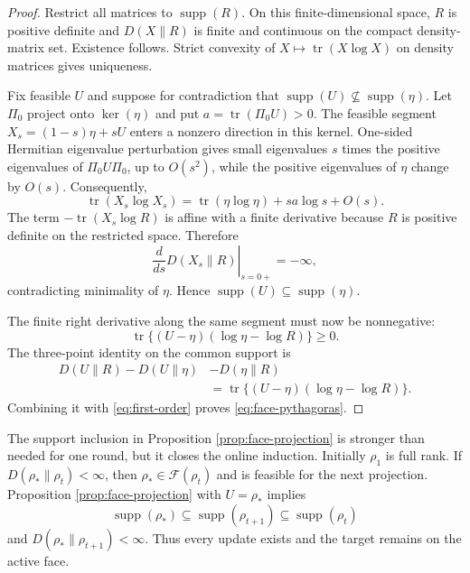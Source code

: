\documentclass[twoside]{article}
\newcommand{\tr}{\operatorname{tr}}
\newcommand{\supp}{\operatorname{supp}}
\begin{document}
\begin{proof}
Restrict all matrices to $\supp(R)$. On this finite-dimensional space, $R$ is positive definite and $D(X\|R)$ is finite and continuous on the compact density-matrix set. Existence follows. Strict convexity of $X\mapsto\tr(X\log X)$ on density matrices gives uniqueness.

Fix feasible $U$ and suppose for contradiction that $\supp(U)\nsubseteq\supp(\eta)$. Let $\Pi_0$ project onto $\ker(\eta)$ and put $a=\tr(\Pi_0U)>0$. The feasible segment $X_s=(1-s)\eta+sU$ enters a nonzero direction in this kernel. One-sided Hermitian eigenvalue perturbation gives small eigenvalues $s$ times the positive eigenvalues of $\Pi_0U\Pi_0$, up to $O(s^2)$, while the positive eigenvalues of $\eta$ change by $O(s)$. Consequently,
\begin{equation}
\tr(X_s\log X_s)=\tr(\eta\log\eta)+sa\log s+O(s).
\label{eq:entropy-boundary-expansion}
\end{equation}
The term $-\tr(X_s\log R)$ is affine with a finite derivative because $R$ is positive definite on the restricted space. Therefore
\begin{equation}
\left.\frac{d}{ds}D(X_s\|R)\right|_{s=0+}=-\infty,
\end{equation}
contradicting minimality of $\eta$. Hence $\supp(U)\subseteq\supp(\eta)$.

The finite right derivative along the same segment must now be nonnegative:
\begin{equation}
\tr\{(U-\eta)(\log\eta-\log R)\}\geq0.
\label{eq:first-order}
\end{equation}
The three-point identity on the common support is
\begin{align}
D(U\|R)-D(U\|\eta)&-D(\eta\|R)\nonumber\\
&=\tr\{(U-\eta)(\log\eta-\log R)\}.
\end{align}
Combining it with \eqref{eq:first-order} proves \eqref{eq:face-pythagoras}.
\end{proof}

The support inclusion in Proposition \ref{prop:face-projection} is stronger than needed for one round, but it closes the online induction. Initially $\rho_1$ is full rank. If $D(\rho_*\|\rho_t)<\infty$, then $\rho_*\in\mathcal F(\rho_t)$ and is feasible for the next projection. Proposition \ref{prop:face-projection} with $U=\rho_*$ implies
\begin{equation}
\supp(\rho_*)\subseteq\supp(\rho_{t+1})\subseteq\supp(\rho_t)
\end{equation}
and $D(\rho_*\|\rho_{t+1})<\infty$. Thus every update exists and the target remains on the active face.
\end{document}
